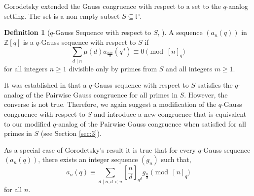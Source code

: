\documentclass{article}
\numberwithin{equation}{section}
\theoremstyle{definition}
\newtheorem{definition}{\bf {Definition}}[section]
\begin{document}
Gorodetsky extended the Gauss congruence with respect to a set to the $q$-analog setting. The set is a non-empty subset $S\subseteq\mathbb{P}$.
\begin{definition}[$q$-Gauss Sequence with respect to $S$, \cite{goro_q-gauss}]
    A sequence $(a_n(q))$ in $\mathbb{Z}[q]$ is a $q$-Gauss sequence with respect to $S$ if
    \begin{equation}\label{eq:017}
        \sum_{d\mid n}\mu(d)a_\frac{nm}{d}(q^d)\equiv 0\pmod{[n]_q}
    \end{equation}
    for all integers $n\geq1$ divisible only by primes from $S$ and all integers $m\geq1$.  
\end{definition}

It was established in \cite{goro_q-gauss} that a $q$-Gauss sequence with respect to $S$ satisfies the $q$-analog of the Pairwise Gauss congruence for all primes in $S$. However, the converse is not true. Therefore, we again suggest a modification of the $q$-Gauss congruence with respect to $S$ and introduce a new congruence that is equivalent to our modified $q$-analog of the Pairwise Gauss congruence when satisfied for all primes in $S$ (see Section \ref{sec:3}).

As a special case of Gorodetsky's result \cite[Proposition 2.5]{goro_q-gauss} it is true that for every $q$-Gauss sequence $(a_n(q))$, there exists an integer sequence $(g_n)$ such that,   
\[
    a_n(q)\equiv\sum_{d\mid n, d<n}\left[\frac{n}{d}\right]_{q^d}g_\frac{n}{d}\pmod{[n]_q}
\]
for all $n$.  
\end{document}
